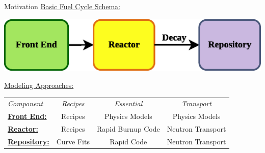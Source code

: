 \documentclass[pdf, autumn, slideColor, nocolorBG]{prosper}
\begin{document}
\begin{slide}{Motivation}
\small \underline{Basic Fuel Cycle Schema:}
\begin{center}
\includegraphics[scale=0.5]{figs/basic_nfc_schema.eps}
\end{center}

\underline{Modeling Approaches:} \small
\begin{center}
\begin{tabular}{lccc}
\textit{Component}                  & \textit{Recipes}  & \textit{Essential} & \textit{Transport}   \\
\underline{\textbf{Front End:}}     & Recipes           & Physics Models     & Physics Models       \\
\underline{\textbf{Reactor:}}       & Recipes           & Rapid Burnup Code  & Neutron Transport    \\
\underline{\textbf{Repository:}}    & Curve Fits        & Rapid Code         & Neutron Transport    \\
\end{tabular}
\end{center}
\end{slide}
\end{document}
